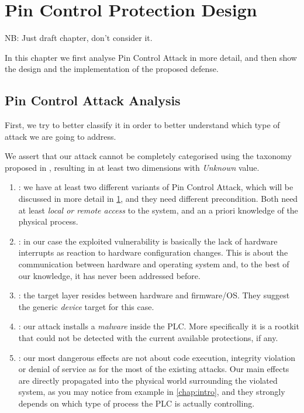 \chapter{Pin Control Protection Design}
\label{chap:design}

{\color{red}NB: Just draft chapter, don't consider it.}

In this chapter we first analyse Pin Control Attack in more detail, and then show the design and the implementation of the proposed defense.

\section{Pin Control Attack Analysis}

First, we try to better classify it in order to better understand which type of attack we are going to address.

We assert that our attack cannot be completely categorised using the taxonomy proposed in \cite{taxonomy}, resulting in at least two dimensions with \emph{Unknown} value.
\begin{enumerate}
	\item {}: we have at least two different variants of Pin Control Attack, which will be discussed in more detail in \chap \ref{chap:design},
		and they need different precondition. Both need at least \emph{local or remote access} to the system, and an a priori knowledge of the physical process.
	\item {}: in our case the exploited vulnerability is basically the lack of hardware interrupts as reaction to hardware configuration changes.
		This is about the communication between hardware and operating system and, to the best of our knowledge, it has never been addressed before.
	\item {}: the target layer resides between hardware and firmware/OS. They suggest the generic \emph{device} target for this case.
	\item {}: our attack installs a \emph{malware} inside the PLC. More specifically it is a rootkit that could not be detected
		with the current available protections, if any.
	\item {}: our most dangerous effects are not about code execution, integrity violation or denial of service as for the most of the existing attacks.
		Our main effects are directly propagated into the physical world surrounding the violated system, as you may notice from example in \chap \ref{chap:intro},
		and they strongly depends on which type of process the PLC is actually controlling.
\end{enumerate}

